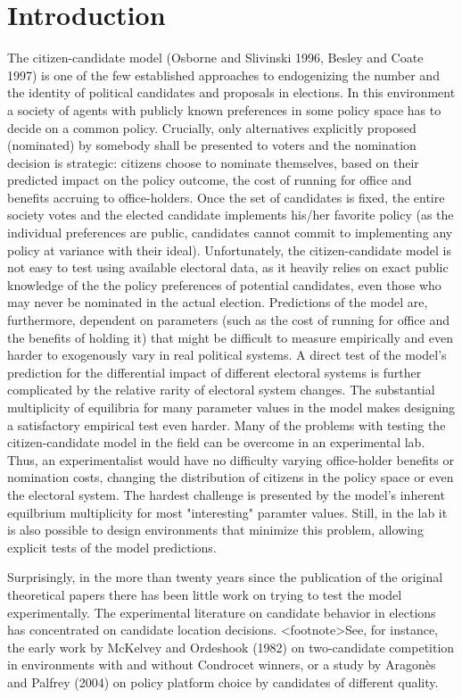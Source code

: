 \section{Introduction}

    The citizen-candidate model (Osborne and Slivinski 1996, Besley and Coate 1997) is one of the few established approaches to endogenizing the number and the identity of political candidates and proposals in elections. In this environment a society of agents with publicly known preferences in some policy space has to decide on a common policy. Crucially, only alternatives explicitly proposed (nominated) by somebody shall be presented to voters and the nomination decision is strategic: citizens choose to nominate themselves, based on their predicted impact on the policy outcome, the cost of running for office and benefits accruing to office-holders. Once the set of candidates is fixed, the entire society votes and the elected candidate implements his/her favorite policy (as the individual preferences are public, candidates cannot commit to implementing any policy at variance with their ideal).
    Unfortunately, the citizen-candidate model is not easy to test using available electoral data, as it heavily relies on exact public knowledge of the the policy preferences of potential candidates, even those who may never be nominated in the actual election. Predictions of the model are, furthermore, dependent on parameters (such as the cost of running for office and the benefits of holding it) that might be difficult to measure empirically and even harder to exogenously vary in real political systems. A direct test of the model's prediction for the differential impact of different electoral systems is further complicated by the relative rarity of electoral system changes. The substantial multiplicity of equilibria for many parameter values in the model makes designing a satisfactory empirical test even harder.
    Many of the problems with testing the citizen-candidate model in the field can be overcome in an experimental lab. Thus, an experimentalist would have no difficulty varying office-holder benefits or nomination costs, changing the distribution of citizens in the policy space or even the electoral system. The hardest challenge is presented by the model's inherent equilbrium multiplicity for most "interesting" paramter values. Still, in the lab it is also possible to design environments that minimize this problem, allowing explicit tests of the model predictions.
    

    Surprisingly, in the more than twenty years since the publication of the original theoretical papers there has been little work on trying to test the model experimentally. The experimental literature on candidate behavior in elections has concentrated on candidate location decisions.
    <footnote>See, for instance, the early work by McKelvey and Ordeshook (1982) on two-candidate competition in environments with and without Condrocet winners, or a study by Aragonès and Palfrey (2004) on policy platform choice by candidates of different quality.
      
